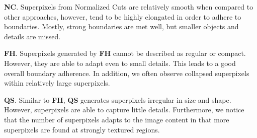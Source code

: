 \begin{figure}
	\label{fig:evaluation-qualitative}
\end{figure}

\textbf{NC}. Superpixels from Normalized Cuts are relatively smooth when compared to other approaches, however, tend to be highly elongated in order to adhere to boundaries. Mostly, strong boundaries are met well, but smaller objects and details are missed.

\textbf{FH}. Superpixels generated by \textbf{FH} cannot be described as regular or compact. However, they are able to adapt even to small details. This leads to a good overall boundary adherence. In addition, we often observe collapsed superpixels within relatively large superpixels.

\textbf{QS}. Similar to \textbf{FH}, \textbf{QS} generates superpixels irregular in size and shape. However, superpixels are able to capture little details. Furthermore, we notice that the number of superpixels adapts to the image content in that more superpixels are found at strongly textured regions.%
